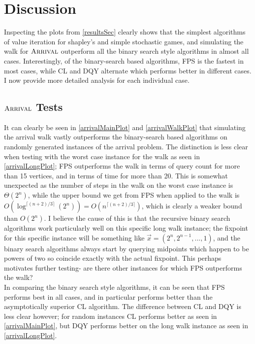 \section{Discussion}
Inspecting the plots from \cref{resultsSec} clearly shows that
the simplest algorithms of value iteration for shapley's and simple stochastic games, and simulating the walk
for $\textsc{Arrival}$ outperform all the binary search style algorithms
 in almost all cases. Interestingly, of the binary-search based
algorithms, FPS 
is the fastest in most cases,
while CL and DQY alternate
which performs better in different cases. I now provide more detailed
analysis for each individual case.
\subsection{$\textsc{Arrival}$ Tests}
It can clearly be seen in \cref{arrivalMainPlot} and \cref{arrivalWalkPlot}
that simulating the arrival walk vastly outperforms the binary-search based
algorithms on randomly generated instances of the arrival problem.
The distinction is less clear when testing with the worst case instance
for the walk as seen in \cref{arrivalLongPlot}; FPS outperforms the walk
in terms of query count for more than 15 vertices, and in terms of time for more than
20. This is somewhat unexpected as the number of steps in the walk on
the worst case instance is $\Theta(2^n)$, while the upper bound we
get from FPS when applied to the walk is 
$O(\log^{\lceil (n + 2)/3 \rceil } (2^n)) = O(n^{\lceil (n + 2)/3 \rceil})$,
which is clearly a weaker bound than $O(2^n)$. I believe the cause of this
is that the recursive binary search algorithms work particularly well
on this specific long walk instance; the fixpoint for this specific instance
will be something like $\vec{x} = (2^{n}, 2^{n - 1}, ..., 1)$, and the
binary search algorithms always start by querying midpoints which happen
to be powers of two so coincide exactly with the actual fixpoint.
This perhaps motivates further testing- are there other instances
for which FPS outperforms the walk?  \\
In comparing the binary search style algorithms, it can be seen that
FPS performs best in all cases, and in particular performs better
than the asymptotically superior CL algorithm. The difference between
CL and DQY is less clear however; for random instances CL performs
better as seen in \cref{arrivalMainPlot},
but DQY performs better on the long walk instance as seen in \cref{arrivalLongPlot}.

